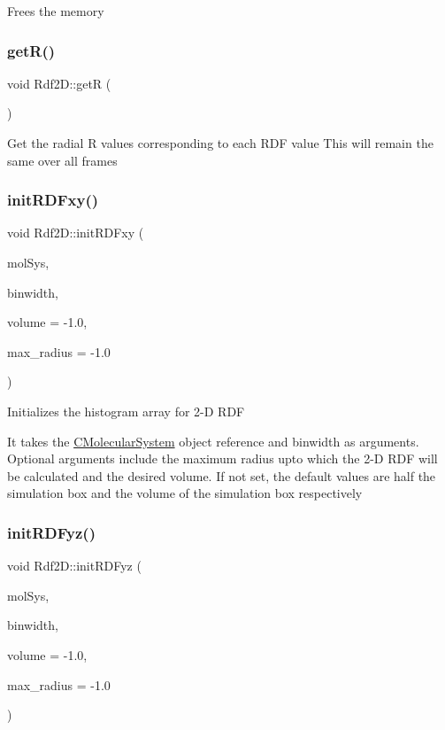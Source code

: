 Frees the memory \mbox{\label{classRdf2D_a3c8153b303733b7e5d320f9b20f37b32}} 
\subsubsection{\texorpdfstring{get\+R()}{getR()}}
{\footnotesize\ttfamily void Rdf2\+D\+::getR (\begin{DoxyParamCaption}{ }\end{DoxyParamCaption})}

Get the radial R values corresponding to each R\+DF value This will remain the same over all frames \mbox{\label{classRdf2D_a767f006de6412394a59f1cae5f7f6b35}} 
\subsubsection{\texorpdfstring{init\+R\+D\+Fxy()}{initRDFxy()}}
{\footnotesize\ttfamily void Rdf2\+D\+::init\+R\+D\+Fxy (\begin{DoxyParamCaption}\item[{class \mbox{\hyperlink{classCMolecularSystem}{C\+Molecular\+System}} \&}]{mol\+Sys,  }\item[{double}]{binwidth,  }\item[{double}]{volume = {\ttfamily -\/1.0},  }\item[{double}]{max\+\_\+radius = {\ttfamily -\/1.0} }\end{DoxyParamCaption})}

Initializes the histogram array for 2-\/D R\+DF

It takes the \mbox{\hyperlink{classCMolecularSystem}{C\+Molecular\+System}} object reference and binwidth as arguments. Optional arguments include the maximum radius upto which the 2-\/D R\+DF will be calculated and the desired volume. If not set, the default values are half the simulation box and the volume of the simulation box respectively \mbox{\label{classRdf2D_adf8c5b9d02268de9ee5ebab8cfe7f3df}} 
\subsubsection{\texorpdfstring{init\+R\+D\+Fyz()}{initRDFyz()}}
{\footnotesize\ttfamily void Rdf2\+D\+::init\+R\+D\+Fyz (\begin{DoxyParamCaption}\item[{class \mbox{\hyperlink{classCMolecularSystem}{C\+Molecular\+System}} \&}]{mol\+Sys,  }\item[{double}]{binwidth,  }\item[{double}]{volume = {\ttfamily -\/1.0},  }\item[{double}]{max\+\_\+radius = {\ttfamily -\/1.0} }\end{DoxyParamCaption})}

